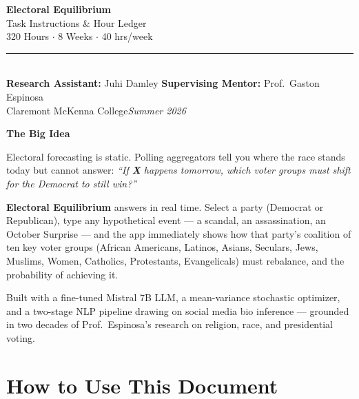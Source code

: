 \documentclass[11pt]{article}
\begin{document}
\begin{center}
  {\LARGE\bfseries Electoral Equilibrium}\\[4pt]
  {\large Task Instructions \& Hour Ledger}\\[6pt]
  {\normalsize 320 Hours $\cdot$ 8 Weeks $\cdot$ 40 hrs/week}\\[8pt]
  \rule{0.6\linewidth}{0.8pt}\\[6pt]
  {\normalsize
    \textbf{Research Assistant:} Juhi Damley\quad
    \textbf{Supervising Mentor:} Prof.\ Gaston Espinosa\\[2pt]
    Claremont McKenna College\quad\textit{Summer 2026}
  }
\end{center}

\vspace{6pt}

\begin{mdframed}[backgroundcolor=taskgray, linecolor=sectionblue,
  linewidth=1pt, innerleftmargin=14pt, innerrightmargin=14pt,
  innertopmargin=10pt, innerbottommargin=10pt]
\textbf{\large The Big Idea}

\medskip
Electoral forecasting is static. Polling aggregators tell you where the race stands
today but cannot answer: \textit{``If \textbf{X} happens tomorrow, which voter groups
must shift for the Democrat to still win?''}

\medskip
\textbf{Electoral Equilibrium} answers in real time. Select a party (Democrat or
Republican), type any hypothetical event --- a scandal, an assassination, an October
Surprise --- and the app immediately shows how that party's coalition of ten key voter
groups (African Americans, Latinos, Asians, Seculars, Jews, Muslims, Women, Catholics,
Protestants, Evangelicals) must rebalance, and the probability of achieving it.

\medskip
Built with a fine-tuned Mistral 7B LLM, a mean-variance stochastic optimizer, and a
two-stage NLP pipeline drawing on social media bio inference --- grounded in two
decades of Prof.\ Espinosa's research on religion, race, and presidential voting.
\end{mdframed}

\vspace{8pt}

\section*{How to Use This Document}
\end{document}
